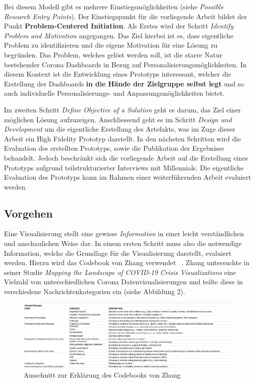\documentclass[12pt, oneside]{article}
\begin{document}
Bei diesem Modell gibt es mehrere Einstiegsmöglichkeiten (siehe \textit{Possible Research Entry Points}). Der Einstiegspunkt für die vorliegende Arbeit bildet der Punkt \textbf{Problem-Centered Initiation}. Als Erstes wird der Schritt \textit{Identify Problem and Motivation} angegangen. Das Ziel hierbei ist es, dass eigentliche Problem zu identifizieren und die eigene Motivation für eine Lösung zu begründen. Das Problem, welches gelöst werden soll, ist die starre Natur bestehender Corona Dashboards in Bezug auf Personalisierungsmöglichkeiten. In diesem Kontext ist die Entwicklung eines Prototyps interessant, welcher die Erstellung der Dashboards \textbf{in die Hände der Zielgruppe selbst legt} und so auch individuelle Personalisierungs- und Anpassungsmöglichkeiten bietet.

Im zweiten Schritt \textit{Define Objective of a Solution} geht es darum, das Ziel einer möglichen Lösung aufzuzeigen. Anschliessend geht es im Schritt \textit{Design und Development} um die eigentliche Erstellung des Artefakts, was im Zuge dieser Arbeit ein High Fidelity Prototyp darstellt. In den nächsten Schritten wird die Evaluation des erstellten Prototyps, sowie die Publikation der Ergebnisse behandelt. Jedoch beschränkt sich die vorliegende Arbeit auf die Erstellung eines Prototyps aufgrund teilstrukturierter Interviews mit Millennials. Die eigentliche Evaluation des Prototyps kann im Rahmen einer weiterführenden Arbeit evaluiert werden.

\clearpage
\subsection{Vorgehen}
Eine Visualisierung stellt eine gewisse \textit{Information} in einer leicht verständlichen und anschaulichen Weise dar. In einem ersten Schritt muss also die notwendige Information, welche die Grundlage für die Visualisierung darstellt, evaluiert werden. Hierzu wird das Codebook von Zhang verwendet ~\citep{YixuanZhang.2021}. Zhang untersuchte in seiner Studie \textit{Mapping the Landscape of COVID-19 Crisis Visualizations} eine Vielzahl von unterschiedlichen Corona Datenvisualisierungen und teilte diese in verschiedene Nachrichtenkategorien ein (siehe Abbildung 2).

\begin{figure}[ht]
    \includegraphics[width=14cm]{images/message_categories_zhang.png}
    \centering
    \caption{Ausschnitt zur Erklärung des Codebooks von Zhang ~\citep{YixuanZhang.2021}}
\end{figure}
\end{document}
